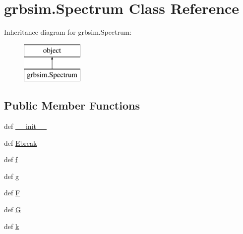 \hypertarget{classgrbsim_1_1_spectrum}{\section{grbsim.\-Spectrum Class Reference}
\label{classgrbsim_1_1_spectrum}
}
Inheritance diagram for grbsim.\-Spectrum\-:\begin{figure}[H]
\begin{center}
\leavevmode
\includegraphics[height=2.000000cm]{classgrbsim_1_1_spectrum}
\end{center}
\end{figure}
\subsection*{Public Member Functions}
\begin{DoxyCompactItemize}
\item 
def \hyperlink{classgrbsim_1_1_spectrum_a0341c6f78c130b7b38216a8bbc187890}{\-\_\-\-\_\-init\-\_\-\-\_\-}
\item 
def \hyperlink{classgrbsim_1_1_spectrum_a23957ee0259fe9a732bcb4ab2c1cfd71}{Ebreak}
\item 
def \hyperlink{classgrbsim_1_1_spectrum_a3e93391e221ca283750d08b8485c9358}{f}
\item 
def \hyperlink{classgrbsim_1_1_spectrum_acf8ca89dded867c619a5dff3189d34c3}{g}
\item 
def \hyperlink{classgrbsim_1_1_spectrum_aa94d37ec5851e690032cc4fe751f8088}{F}
\item 
def \hyperlink{classgrbsim_1_1_spectrum_a3c80da83d9dd35dd221b34ba511350dc}{G}
\item 
def \hyperlink{classgrbsim_1_1_spectrum_ad6edd414e3397c1513b16052e0853afd}{k}
\end{DoxyCompactItemize}
